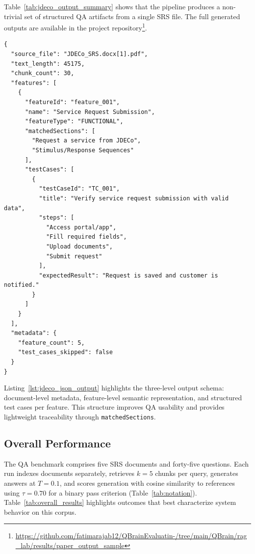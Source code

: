 \documentclass[conference]{IEEEtran}
\begin{document}
Table~\ref{tab:jdeco_output_summary} shows that the pipeline produces a non-trivial set of structured QA artifacts from a single SRS file. The full generated outputs are available in the project repository\footnote{\url{https://github.com/fatimarajab12/QBrainEvaluatin-/tree/main/QBrain/rag_lab/results/paper_output_sample}}.

\begin{lstlisting}[caption={Abridged JSON artifact generated from JDECo SRS.},label={lst:jdeco_json_output}]
{
  "source_file": "JDECo_SRS.docx[1].pdf",
  "text_length": 45175,
  "chunk_count": 30,
  "features": [
    {
      "featureId": "feature_001",
      "name": "Service Request Submission",
      "featureType": "FUNCTIONAL",
      "matchedSections": [
        "Request a service from JDECo",
        "Stimulus/Response Sequences"
      ],
      "testCases": [
        {
          "testCaseId": "TC_001",
          "title": "Verify service request submission with valid data",
          "steps": [
            "Access portal/app",
            "Fill required fields",
            "Upload documents",
            "Submit request"
          ],
          "expectedResult": "Request is saved and customer is notified."
        }
      ]
    }
  ],
  "metadata": {
    "feature_count": 5,
    "test_cases_skipped": false
  }
}
\end{lstlisting}

Listing~\ref{lst:jdeco_json_output} highlights the three-level output schema: document-level metadata, feature-level semantic representation, and structured test cases per feature. This structure improves QA usability and provides lightweight traceability through \texttt{matchedSections}.

\subsection{Overall Performance}

The QA benchmark comprises five SRS documents and forty-five questions. Each run indexes documents separately, retrieves $k{=}5$ chunks per query, generates answers at $T{=}0.1$, and scores generation with cosine similarity to references using $\tau{=}0.70$ for a binary pass criterion (Table~\ref{tab:notation}). Table~\ref{tab:overall_results} highlights outcomes that best characterize system behavior on this corpus.
\end{document}

